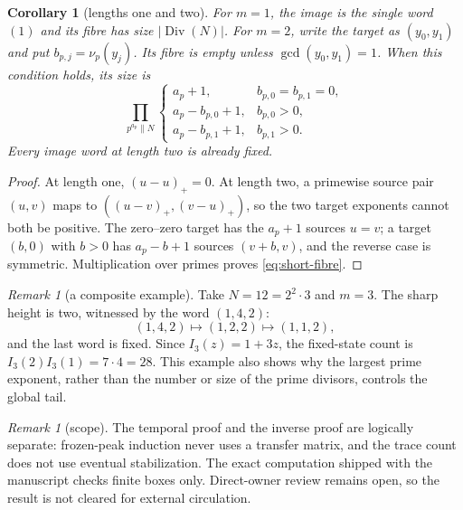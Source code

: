 \documentclass[a4paper,11pt]{amsart}
\newtheorem{corollary}[theorem]{Corollary}
\theoremstyle{remark}
\newtheorem{remark}[theorem]{Remark}
\newcommand{\Div}{\operatorname{Div}}
\begin{document}
\begin{corollary}[lengths one and two]\label{cor:short-fibres}
For $m=1$, the image is the single word $(1)$ and its fibre has size
$|\Div(N)|$.  For $m=2$, write the target as $(y_0,y_1)$ and put
$b_{p,j}=\nu_p(y_j)$.  Its fibre is empty unless
$\gcd(y_0,y_1)=1$.  When this condition holds, its size is
\begin{equation}\label{eq:short-fibre}
 \prod_{p^{a_p}\parallel N}
 \begin{cases}
  a_p+1,&b_{p,0}=b_{p,1}=0,\\
  a_p-b_{p,0}+1,&b_{p,0}>0,\\
  a_p-b_{p,1}+1,&b_{p,1}>0.
 \end{cases}
\end{equation}
Every image word at length two is already fixed.
\end{corollary}

\begin{proof}
At length one, $(u-u)_+=0$.  At length two, a primewise source pair
$(u,v)$ maps to $((u-v)_+,(v-u)_+)$, so the two target exponents cannot both
be positive.  The zero--zero target has the $a_p+1$ sources $u=v$; a target
$(b,0)$ with $b>0$ has $a_p-b+1$ sources $(v+b,v)$, and the reverse case is
symmetric.  Multiplication over primes proves \eqref{eq:short-fibre}.
\end{proof}

\begin{remark}[a composite example]
Take $N=12=2^2\cdot3$ and $m=3$.  The sharp height is two, witnessed by the
word $(1,4,2)$:
\[
 (1,4,2)\longmapsto(1,2,2)\longmapsto(1,1,2),
\]
and the last word is fixed.  Since $I_3(z)=1+3z$, the fixed-state count is
$I_3(2)I_3(1)=7\cdot4=28$.  This example also shows why the largest prime
exponent, rather than the number or size of the prime divisors, controls the
global tail.
\end{remark}

\begin{remark}[scope]
The temporal proof and the inverse proof are logically separate: frozen-peak
induction never uses a transfer matrix, and the trace count does not use
eventual stabilization.  The exact computation shipped with the manuscript
checks finite boxes only.  Direct-owner review remains open, so the result is
not cleared for external circulation.
\end{remark}



\end{document}
